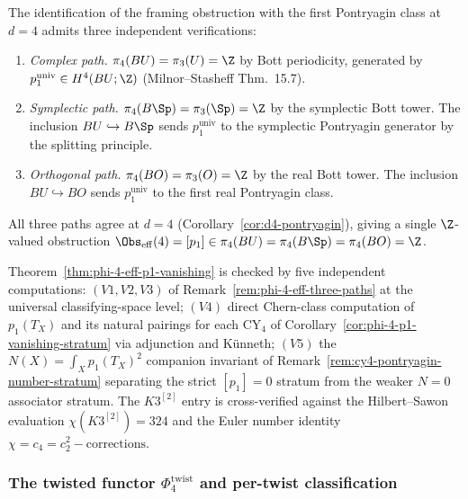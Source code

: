 \begin{remark}[Three independent verification paths for \texorpdfstring{$p_1 = \Obs_{\mathrm{eff}}(4)$}{p-1 = Obs-eff(4)}]
\label{rem:phi-4-eff-three-paths}
The identification of the framing obstruction with the first Pontryagin class
at $d = 4$ admits three independent verifications:
\begin{enumerate}[label=\textup{(}V\arabic*\textup{)}]
 \item \emph{Complex path.} $\pi_4(BU) = \pi_3(U) = \Z$ by Bott
 periodicity, generated by $p_1^{\mathrm{univ}} \in H^4(BU; \Z)$
 \textup{(}Milnor--Stasheff Thm.~15.7\textup{)}.
 \item \emph{Symplectic path.} $\pi_4(B\Sp) = \pi_3(\Sp) = \Z$ by the
 symplectic Bott tower. The inclusion $BU \hookrightarrow B\Sp$ sends
 $p_1^{\mathrm{univ}}$ to the symplectic Pontryagin generator by the
 splitting principle.
 \item \emph{Orthogonal path.} $\pi_4(BO) = \pi_3(O) = \Z$ by the real
 Bott tower. The inclusion $BU \hookrightarrow BO$ sends
 $p_1^{\mathrm{univ}}$ to the first real Pontryagin class.
\end{enumerate}
All three paths agree at $d = 4$ \textup{(}Corollary~\ref{cor:d4-pontryagin}\textup{)}, giving
a single $\Z$-valued obstruction $\Obs_{\mathrm{eff}}(4) = [p_1] \in
\pi_4(BU) = \pi_4(B\Sp) = \pi_4(BO) = \Z$.
\end{remark}
Theorem~\ref{thm:phi-4-eff-p1-vanishing} is checked by five independent
computations: $(V1, V2, V3)$ of Remark~\ref{rem:phi-4-eff-three-paths} at
the universal classifying-space level; $(V4)$ direct Chern-class computation
of \(p_1(T_X)\) and its natural pairings for each CY${}_4$ of
Corollary~\ref{cor:phi-4-p1-vanishing-stratum} via adjunction and K\"unneth;
$(V5)$ the $N(X) = \int_X p_1(T_X)^2$ companion invariant of
Remark~\ref{rem:cy4-pontryagin-number-stratum} separating the strict
$[p_1] = 0$ stratum from the weaker $N = 0$ associator stratum. The
$K3^{[2]}$ entry is cross-verified against the Hilbert--Sawon evaluation
$\chi(K3^{[2]}) = 324$ and the Euler number identity
$\chi = c_4 = c_2^2 - \text{corrections}$.

\subsubsection{The twisted functor \texorpdfstring{$\Phi_4^{\mathrm{twist}}$}{Phi-4-twist} and per-twist classification}
\label{subsubsec:phi-4-twist-per-twist}

